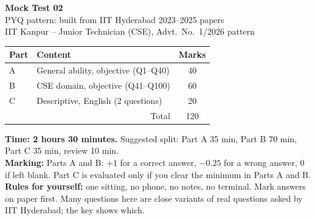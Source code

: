 \documentclass[11pt,a4paper]{article}
\begin{document}
\begin{center}
{\LARGE\bfseries\color{slate}Mock Test 02}\\[2pt]
{\large\color{ember}PYQ pattern: built from IIT Hyderabad 2023--2025 papers}\\[4pt]
{\large IIT Kanpur -- Junior Technician (CSE), Advt.\ No.\ 1/2026 pattern}\\[6pt]
\begin{tabular}{|l|l|c|}\hline
\textbf{Part} & \textbf{Content} & \textbf{Marks}\\\hline
A & General ability, objective (Q1--Q40) & 40\\
B & CSE domain, objective (Q41--Q100) & 60\\
C & Descriptive, English (2 questions) & 20\\\hline
\multicolumn{2}{|r|}{Total} & 120\\\hline
\end{tabular}
\end{center}
\textbf{Time: 2 hours 30 minutes.} Suggested split: Part A 35 min, Part B 70 min, Part C 35 min, review 10 min.\\
\textbf{Marking:} Parts A and B: $+1$ for a correct answer, $-0.25$ for a wrong answer, 0 if left blank.
Part C is evaluated only if you clear the minimum in Parts A and B.\\
\textbf{Rules for yourself:} one sitting, no phone, no notes, no terminal. Mark answers on paper first.
Many questions here are close variants of real questions asked by IIT Hyderabad; the key shows which.
\end{document}
